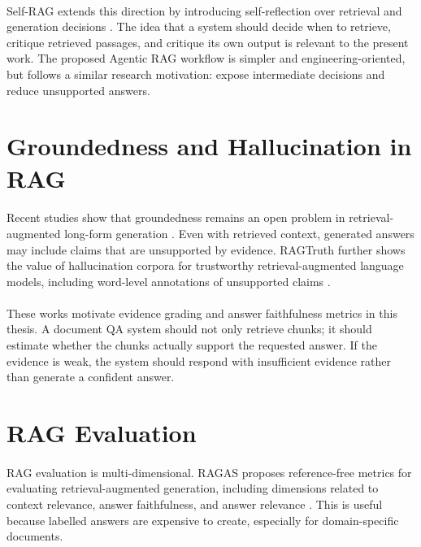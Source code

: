 \paragraph{} Self-RAG extends this direction by introducing self-reflection over retrieval and generation decisions \cite{asai2023selfrag}. The idea that a system should decide when to retrieve, critique retrieved passages, and critique its own output is relevant to the present work. The proposed Agentic RAG workflow is simpler and engineering-oriented, but follows a similar research motivation: expose intermediate decisions and reduce unsupported answers.

\section{Groundedness and Hallucination in RAG}
\paragraph{} Recent studies show that groundedness remains an open problem in retrieval-augmented long-form generation \cite{gao2024groundedness}. Even with retrieved context, generated answers may include claims that are unsupported by evidence. RAGTruth further shows the value of hallucination corpora for trustworthy retrieval-augmented language models, including word-level annotations of unsupported claims \cite{niu2024ragtruth}.

\paragraph{} These works motivate evidence grading and answer faithfulness metrics in this thesis. A document QA system should not only retrieve chunks; it should estimate whether the chunks actually support the requested answer. If the evidence is weak, the system should respond with insufficient evidence rather than generate a confident answer.

\section{RAG Evaluation}
\paragraph{} RAG evaluation is multi-dimensional. RAGAS proposes reference-free metrics for evaluating retrieval-augmented generation, including dimensions related to context relevance, answer faithfulness, and answer relevance \cite{es2023ragas}. This is useful because labelled answers are expensive to create, especially for domain-specific documents.

